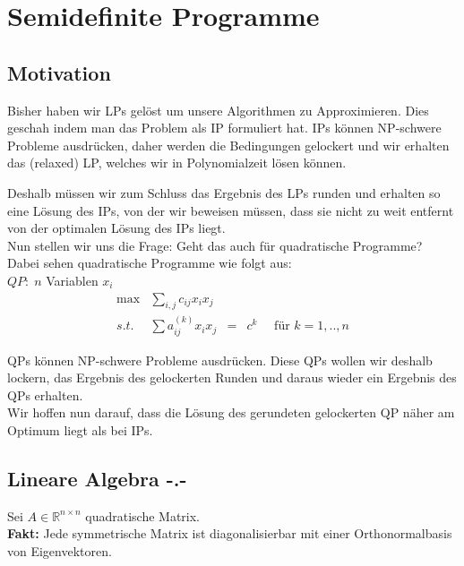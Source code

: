 \documentclass[ngerman,a4paper,11pt]{article}
\begin{document}
\section{Semidefinite Programme}

\subsection{Motivation}

Bisher haben wir LPs gelöst um unsere Algorithmen zu Approximieren.
Dies geschah indem man das Problem als IP formuliert hat. IPs können
NP-schwere Probleme ausdrücken, daher werden die Bedingungen gelockert
und wir erhalten das (relaxed) LP, welches wir in Polynomialzeit lösen können.

Deshalb müssen wir zum Schluss das Ergebnis des LPs runden und erhalten so eine
Lösung des IPs, von der wir beweisen müssen, dass sie nicht zu weit entfernt von
der optimalen Lösung des IPs liegt.\\

Nun stellen wir uns die Frage: Geht das auch für quadratische Programme?\\

Dabei sehen quadratische Programme wie folgt aus:\\
$QP: \; n$ Variablen $x_i$\\
$$\begin{array}{rcl}
   \max &\underset{i,j}{\sum} c_{ij} x_ix_j\\
   s.t.& \sum a_{ij}^{(k)} x_i x_j &=& c^k \quad \text{ für }k=1,..,n
\end{array}$$

QPs können NP-schwere Probleme ausdrücken. Diese QPs wollen wir deshalb lockern,
das Ergebnis des gelockerten Runden und daraus wieder ein Ergebnis des QPs erhalten.\\

Wir hoffen nun darauf, dass die Lösung des gerundeten gelockerten QP näher am Optimum liegt
als bei IPs.

\subsection{Lineare Algebra -.-}

Sei $A \in \mathbb{R}^{n\times n}$ quadratische Matrix.\\

\textbf{Fakt:} Jede symmetrische Matrix ist diagonalisierbar mit einer Orthonormalbasis von Eigenvektoren.\\
\end{document}
